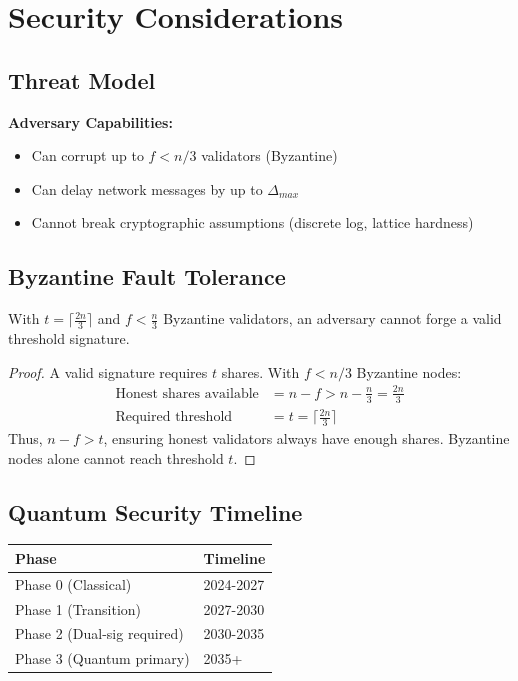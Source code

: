 \section{Security Considerations}


\subsection{Threat Model}

\textbf{Adversary Capabilities:}
\begin{itemize}
\item Can corrupt up to $f < n/3$ validators (Byzantine)
\item Can delay network messages by up to $\Delta_{max}$
\item Cannot break cryptographic assumptions (discrete log, lattice hardness)
\end{itemize}

\subsection{Byzantine Fault Tolerance}

\begin{theorem}
With $t = \lceil \frac{2n}{3} \rceil$ and $f < \frac{n}{3}$ Byzantine validators, an adversary cannot forge a valid threshold signature.
\end{theorem}

\begin{proof}
A valid signature requires $t$ shares. With $f < n/3$ Byzantine nodes:
\begin{align}
\text{Honest shares available} &= n - f > n - \frac{n}{3} = \frac{2n}{3} \\
\text{Required threshold} &= t = \lceil \frac{2n}{3} \rceil
\end{align}
Thus, $n - f > t$, ensuring honest validators always have enough shares. Byzantine nodes alone cannot reach threshold $t$.
\end{proof}

\subsection{Quantum Security Timeline}

\begin{table}[h]
\centering
\begin{tabular}{@{}ll@{}}
\toprule
\textbf{Phase} & \textbf{Timeline} \\
\midrule
Phase 0 (Classical) & 2024-2027 \\
Phase 1 (Transition) & 2027-2030 \\
Phase 2 (Dual-sig required) & 2030-2035 \\
Phase 3 (Quantum primary) & 2035+ \\
\bottomrule
\end{tabular}

\label{tab:quantum-timeline}
\end{table}

